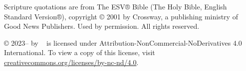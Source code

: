 \documentclass[print]{dspbook}
\begin{document}
\vspace{0.5cm}
{
\footnotesize\noindent
Scripture quotations are from The ESV® Bible (The Holy Bible, English Standard Version®),
copyright © 2001 by Crossway, a publishing ministry of Good News Publishers. Used by
permission. All rights reserved.
}

\vspace{0.5cm}
{
\footnotesize\noindent
\thetitle{} © 2023--\the\year{} by \theauthor{}~ is licensed under
Attribution-NonCommercial-NoDerivatives 4.0 International. To view a copy of this license,
visit
\href{http://creativecommons.org/licenses/by-nc-nd/4.0/}{creativecommons.org/licenses/by-nc-nd/4.0}.
}

\cleardoublepage



\cleardoublepage



\cleardoublepage

\tableofcontents

\cleardoublepage

\mainmatter










\startappendices




\backmatter

\printglossary

\printbibliography[heading=bibintoc]
\end{document}
